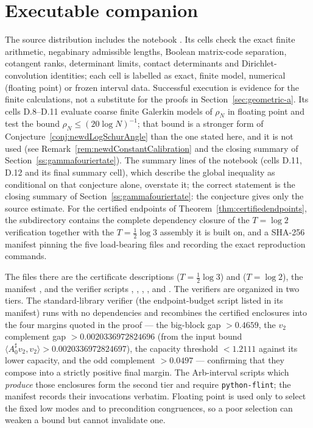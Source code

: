 \documentclass[11pt]{amsart}
\theoremstyle{definition}
\theoremstyle{remark}
\begin{document}
\section*{Executable companion}

The source distribution includes the notebook
.  Its cells check
the exact finite arithmetic, negabinary admissible lengths, Boolean
matrix-code separation, cotangent ranks, determinant limits, contact
determinants and Dirichlet-convolution identities; each cell is labelled as
exact, finite model, numerical (floating point) or frozen interval data.
Successful execution is evidence for the finite calculations, not a
substitute for the proofs in Section~\ref{sec:geometric-a}.  Its cells
D.8--D.11 evaluate coarse finite Galerkin models of $\rho_N$ in floating
point and test the bound $\rho_N\le(20\log N)^{-1}$; that bound is a
stronger form of Conjecture~\ref{conj:newdLogSchurAngle} than the one
stated here, and it is not used (see
Remark~\ref{rem:newdConstantCalibration} and the closing summary of
Section~\ref{ss:gammafouriertate}).
The summary lines of the notebook (cells D.11, D.12 and its final summary
cell), which describe the global inequality as conditional on that
conjecture alone, overstate it; the correct statement is the closing summary of
Section~\ref{ss:gammafouriertate}: the conjecture gives only the source
estimate.
For the certified endpoints of
Theorem~\ref{thm:certifiedendpoints}, the subdirectory
 contains the complete dependency closure of the
\(T=\log2\) verification together with the \(T=\frac12\log3\) assembly it is
built on, and a SHA-256 manifest pinning the five load-bearing files and
recording the exact reproduction commands.

The files there are the certificate descriptions
 ($T=\frac12\log3$)
and  ($T=\log2$),
the manifest , and the
verifier scripts ,
,
,
,
 and
.
The verifiers are organized in two tiers.  The standard-library verifier
(the endpoint-budget script listed in its manifest) runs with no dependencies
and recombines the certified enclosures into the four margins quoted in the
proof --- the big-block gap \(>0.4659\), the \(v_2\) complement gap
\(>0.0020336972824696\) (from the input bound
\(\langle A_0^\sharp v_2,v_2\rangle>0.0020336972824697\)), the capacity threshold \(<1.2111\) against its lower
capacity, and the odd complement \(>0.0497\) --- confirming that they compose
into a strictly positive final margin.  The Arb-interval scripts which
\emph{produce} those enclosures form the second tier and require
\texttt{python-flint}; the manifest records their invocations verbatim.
Floating point is used only to select the fixed low modes and to precondition
congruences, so a poor selection can weaken a bound but cannot invalidate one.
\end{document}
